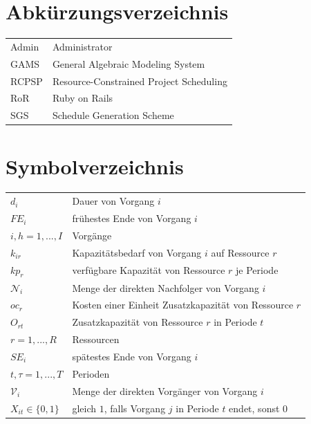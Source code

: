 \documentclass[a4paper,12pt,parskip,bibtotoc,liststotoc]{article}
\begin{document}
\section*{Abkürzungsverzeichnis}
\begin{table}[h!]
    \vspace*{-3mm}
    \hspace*{2mm}
  \renewcommand{\arraystretch}{1,5}
    \begin{tabular}{ll}  %
	Admin & Administrator \\         
	GAMS & General Algebraic Modeling System\\
	RCPSP      & Resource-Constrained Project Scheduling \\
           RoR & Ruby on Rails \\
SGS & Schedule Generation Scheme\\
	\end{tabular}
\end{table}

\newpage
\renewcommand\lstlistlistingname{Quellcodeverzeichnis} 
\lstlistoflistings 
\renewcommand*\lstlistingname{Quellcode} 

\newpage

\newpage
\section*{Symbolverzeichnis}
\begin{table}[h!]
    \vspace*{-3mm}
        \hspace*{2mm}
      \renewcommand{\arraystretch}{1,5}
    \begin{tabular}{ll} 
$d_i$ & Dauer von Vorgang $i$ \\
$FE_i$& frühestes Ende von Vorgang $i$\\
$i,h=1,...,I$ & Vorgänge \\
$k_{ir}$& Kapazitätsbedarf von Vorgang $i$ auf Ressource $r$\\
$kp_r$ & verfügbare Kapazität von Ressource $r$ je Periode\\
$\mathcal{N}_i$ & Menge der direkten Nachfolger von Vorgang $i$ \\
$oc_r$ & Kosten einer Einheit Zusatzkapazität von Ressource $r$ \\
$O_{rt}$ & Zusatzkapazität von Ressource $r$ in Periode $t$ \\
$r=1,...,R$ & Ressourcen \\
$SE_i$& spätestes Ende von Vorgang $i$\\
$t,\tau=1,..., T$ & Perioden\\
$\mathcal{V}_i$ & Menge der direkten Vorgänger von Vorgang $i$ \\
$X_{it}\in\{0,1\}$ & gleich $1$, falls Vorgang $j$ in Periode $t$ endet, sonst $0$
  	\end{tabular}
\end{table}
\newpage
{}   %
\end{document}
